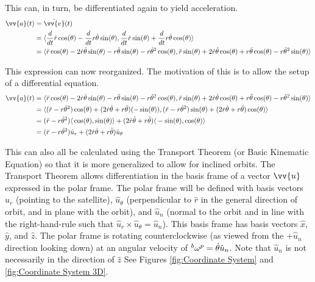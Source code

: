 \documentclass{article}
\begin{document}
This can, in turn, be differentiated again to yield acceleration.
\begin{align*}
    \vv{a}(t) & =\dot{\vv{v}}(t)                                                                                                                                                                                                                              \\
              & =\langle{}\frac{d}{dt}\dot{r}\cos(\theta)-\frac{d}{dt}r\dot{\theta}\sin(\theta), \frac{d}{dt}\dot{r}\sin(\theta)+\frac{d}{dt}r\dot{\theta}\cos(\theta)\rangle{}                                                                               \\
              & =\langle{}\ddot{r}\cos(\theta)-2\dot{r}\dot{\theta}\sin(\theta)-r\ddot{\theta}\sin(\theta)-r\dot{\theta}^2\cos(\theta), \ddot{r}\sin(\theta)+2\dot{r}\dot{\theta}\cos(\theta)+r\ddot{\theta}\cos(\theta)-r\dot{\theta}^2\sin(\theta)\rangle{}
\end{align*}

This expression can now reorganized. The motivation of this is to allow the setup of a differential equation.
\begin{align*}
    \vv{a}(t) & =\langle{}\ddot{r}\cos(\theta)-2\dot{r}\dot{\theta}\sin(\theta)-r\ddot{\theta}\sin(\theta)-r\dot{\theta}^2\cos(\theta), \ddot{r}\sin(\theta)+2\dot{r}\dot{\theta}\cos(\theta)+r\ddot{\theta}\cos(\theta)-r\dot{\theta}^2\sin(\theta)\rangle{} \\
              & =\langle{}(\ddot{r}-r\dot{\theta}^2)\cos(\theta)+(2\dot{r}\dot{\theta}+r\ddot{\theta})(-\sin(\theta)), (\ddot{r}-r\dot{\theta}^2)\sin(\theta)+(2\dot{r}\dot{\theta}+r\ddot{\theta})\cos(\theta)\rangle{}                                      \\
              & =(\ddot{r}-r\dot{\theta}^2)\langle{}\cos(\theta),\sin(\theta)\rangle{}+(2\dot{r}\dot{\theta}+r\ddot{\theta})\langle{}-\sin(\theta), \cos(\theta)\rangle{}                                                                                     \\
              & =(\ddot{r}-r\dot{\theta}^2)\hat{u}_r+(2\dot{r}\dot{\theta}+r\ddot{\theta})\hat{u}_\theta
\end{align*}

This can also all be calculated using the Transport Theorem (or Basic Kinematic Equation) so that it is more generalized to allow for inclined orbits. The Transport Theorem allows differentiation in the basis frame of a vector $\vv{u}$ expressed in the polar frame. The polar frame will be defined with basis vectors $\hat{u}_r$ (pointing to the satellite), $\hat{u}_\theta$ (perpendicular to $\hat{r}$ in the general direction of orbit, and in plane with the orbit), and $\hat{u}_n$ (normal to the orbit and in line with the right-hand-rule such that $\hat{u}_r\times\hat{u}_\theta=\hat{u}_n$). This basis frame has basis vectors $\hat{x}$, $\hat{y}$, and $\hat{z}$. The polar frame is rotating counterclockwise (as viewed from the $+\hat{u}_n$ direction looking down) at an angular velocity of $\prescript{b}{}{\omega}^{p}=\dot{\theta}\hat{u}_n$. Note that $\hat{u}_n$ is not necessarily in the direction of $\hat{z}$ See Figures \ref{fig:Coordinate System} and \ref{fig:Coordinate System 3D}.
\end{document}
